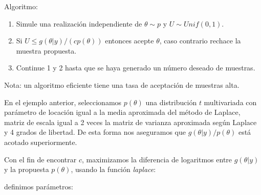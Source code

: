 \documentclass[
  12pt,
]{book}
\newenvironment{Shaded}{\begin{snugshade}}{\end{snugshade}}
\newcommand{\AttributeTok}[1]{\textcolor[rgb]{0.77,0.63,0.00}{#1}}
\newcommand{\ConstantTok}[1]{\textcolor[rgb]{0.00,0.00,0.00}{#1}}
\newcommand{\ControlFlowTok}[1]{\textcolor[rgb]{0.13,0.29,0.53}{\textbf{#1}}}
\newcommand{\DecValTok}[1]{\textcolor[rgb]{0.00,0.00,0.81}{#1}}
\newcommand{\FunctionTok}[1]{\textcolor[rgb]{0.00,0.00,0.00}{#1}}
\newcommand{\NormalTok}[1]{#1}
\newcommand{\OtherTok}[1]{\textcolor[rgb]{0.56,0.35,0.01}{#1}}
\newcommand{\SpecialCharTok}[1]{\textcolor[rgb]{0.00,0.00,0.00}{#1}}
\providecommand{\tightlist}{%
  \setlength{\itemsep}{0pt}\setlength{\parskip}{0pt}}
\theoremstyle{definition}
\theoremstyle{definition}
\theoremstyle{definition}
\theoremstyle{definition}
\theoremstyle{remark}
\begin{document}
Algoritmo:

\begin{enumerate}
\def\labelenumi{\arabic{enumi}.}
\tightlist
\item
  Simule una realización independiente de \(\theta \sim p\) y \(U\sim Unif(0,1)\).
\item
  Si \(U\leq g(\theta|y)/(cp(\theta))\) entonces acepte \(\theta\), caso contrario rechace la muestra propuesta.
\item
  Continue 1 y 2 hasta que se haya generado un número deseado de muestras.
\end{enumerate}

Nota: un algoritmo eficiente tiene una tasa de aceptación de muestras alta.

En el ejemplo anterior, seleccionamos \(p(\theta)\) una distribución \(t\) multivariada con parámetro de locación igual a la media aproximada del método de Laplace, matriz de escala igual a 2 veces la matriz de varianza aproximada según Laplace y 4 grados de libertad. De esta forma nos aseguramos que \(g(\theta|y)/p(\theta)\) está acotado superiormente.

Con el fin de encontrar \(c\), maximizamos la diferencia de logaritmos entre \(g(\theta|y)\) y la propuesta \(p(\theta)\), usando la función \emph{laplace}:

\begin{Shaded}
\end{Shaded}

definimos parámetros:

\begin{Shaded}
\end{Shaded}
\end{document}
